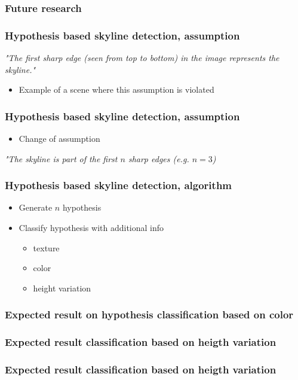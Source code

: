 \documentclass{beamer}
\begin{document}
\frame
{
	\frametitle{Future research}
}

\frame
{
	\frametitle{Hypothesis based skyline detection, assumption}
	\emph{"The first sharp edge (seen from top to bottom) in the image represents the skyline."}
	\begin{itemize}
	\item <+-| alert@+> Example of a scene where this assumption is violated
	\end{itemize}
}

\frame
{
	\frametitle{Hypothesis based skyline detection, assumption}
	\begin{itemize}
	\item <+-| alert@+> Change of assumption
	\end{itemize}
	\emph{"The skyline is part of the first $n$ sharp edges (e.g.  $n=3$)}
}

\frame
{
	\frametitle{Hypothesis based skyline detection, algorithm}
	\begin{itemize}
	\item <+-| alert@+> Generate $n$ hypothesis
	\item <+-| alert@+> Classify hypothesis with additional info
		\begin{itemize}
		\item <+-| alert@+> texture 
		\item <+-| alert@+> color
		\item <+-| alert@+> height variation 
		\end{itemize}
	\end{itemize}
}

\frame
{
	\frametitle{Expected result on hypothesis classification based on color}
}

\frame
{
	\frametitle{Expected result classification based on heigth variation}
}
\frame
{
	\frametitle{Expected result classification based on heigth variation}
}
\end{document}
